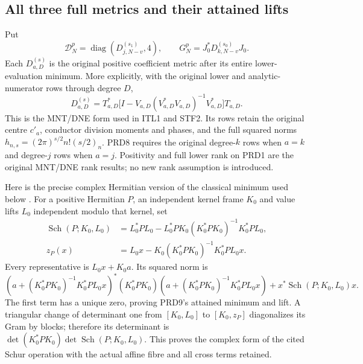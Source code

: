 \subsection{All three full metrics and their attained lifts}
Put
\[
 \mathcal D_N^p=\operatorname{diag}(D_{j,N-v}^{(s_1)},4),
 \qquad G_N^p=J_0^*D_{k,N-v}^{(s_0)}J_0.                  \tag{PRD7}
\]
Each $D_{a,D}^{(s)}$ is the original positive coefficient metric
after its entire lower-evaluation minimum. More explicitly, with
the original lower and analytic-numerator rows through degree $D$,
\[
 D_{a,D}^{(s)}=T_{a,D}^*
 \bigl[I-V_{a,D}(V_{a,D}^*V_{a,D})^{-1}V_{a,D}^*\bigr]T_{a,D}.
                                                               \tag{PRD8}
\]
This is the MNT/DNE form used in ITL1 and STF2. Its rows retain
the original centre $c'_a$, conductor division moments and phases,
and the full squared norms
$h_{n,s}=(2\pi)^{s/2}n!(s/2)_n$. PRD8 requires the original
degree-$k$ rows when $a=k$ and degree-$j$ rows when $a=j$.
Positivity and full lower rank on PRD1 are the original MNT/DNE
rank results; no new rank assumption is introduced.

Here is the precise complex Hermitian version of the classical
minimum used below \cite[Appendix A.5.5, p.~650]{human:boyd-vandenberghe}.
For a positive Hermitian $P$, an independent kernel frame $K_0$
and value lifts $L_0$ independent modulo that kernel, set
\[
 \begin{split}
 \operatorname{Sch}(P;K_0,L_0)
  &=L_0^*PL_0-L_0^*PK_0(K_0^*PK_0)^{-1}K_0^*PL_0,\\
 z_P(x)&=L_0x-K_0(K_0^*PK_0)^{-1}K_0^*PL_0x.
 \end{split}                                                     \tag{PRD9}
\]
Every representative is $L_0x+K_0a$. Its squared norm is
\[
 (a+(K_0^*PK_0)^{-1}K_0^*PL_0x)^*(K_0^*PK_0)
 (a+(K_0^*PK_0)^{-1}K_0^*PL_0x)
 +x^*\operatorname{Sch}(P;K_0,L_0)x.
\]
The first term has a unique zero, proving PRD9's attained minimum
and lift. A triangular change of determinant one from
$[K_0,L_0]$ to $[K_0,z_P]$ diagonalizes its Gram by blocks;
therefore its determinant is
$\det(K_0^*PK_0)\det\operatorname{Sch}(P;K_0,L_0)$.
This proves the complex form of the cited Schur operation with
the actual affine fibre and all cross terms retained.

